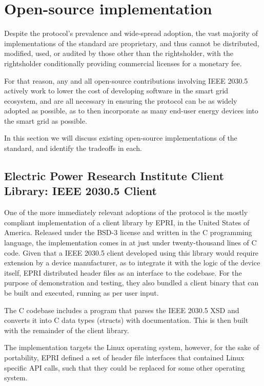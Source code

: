 \section{Open-source implementation}

Despite the protocol's prevalence and wide-spread adoption, the vast majority of implementations of the standard are proprietary, and thus cannot be distributed, modified, used, or audited by those other than the rightsholder, with the rightsholder conditionally providing commercial licenses for a monetary fee. 

For that reason, any and all open-source contributions involving IEEE 2030.5 actively work to lower the cost of developing software in the smart grid ecosystem, and are all necessary in ensuring the protocol can be as widely adopted as possible, as to then incorporate as many end-user energy devices into the smart grid as possible.

In this section we will discuss existing open-source implementations of the standard, and identify the tradeoffs in each.

\subsection{Electric Power Research Institute Client Library: IEEE 2030.5 Client}
One of the more immediately relevant adoptions of the protocol is the mostly compliant implementation of a client library by EPRI, in the United States of America.
Released under the BSD-3 license and written in the C programming language, the implementation comes in at just under twenty-thousand lines of C code.
Given that a IEEE 2030.5 client developed using this library would require extension by a device manufacturer, as to integrate it with the logic of the device itself, EPRI distributed header files as an interface to the codebase.
For the purpose of demonstration and testing, they also bundled a client binary that can be built and executed, running as per user input.

The C codebase includes a program that parses the IEEE 2030.5 XSD and converts it into C data types (structs) with documentation. This is then built with the remainder of the client library.

The implementation targets the Linux operating system, however, for the sake of portability, EPRI defined a set of header file interfaces that contained Linux specific API calls, such that they could be replaced for some other operating system.

